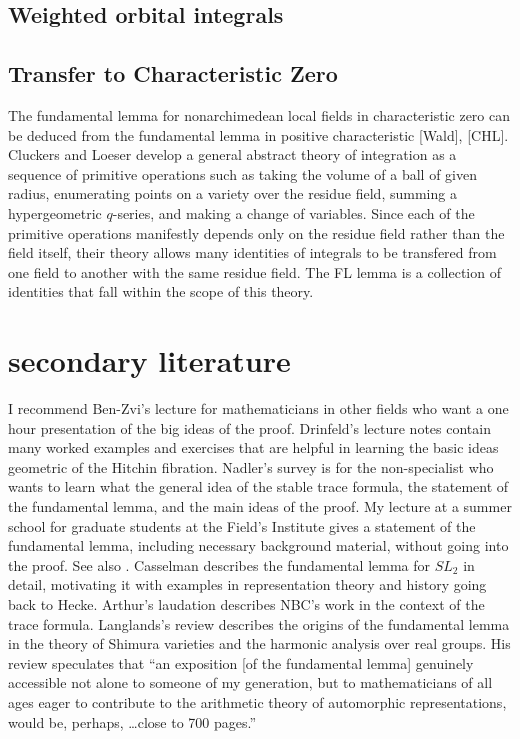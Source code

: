 \documentclass[brochure,english,12pt]{bourbaki}
\begin{document}
\subsection{Weighted orbital integrals}

\subsection{Transfer to Characteristic Zero}

The fundamental lemma for nonarchimedean local fields in
characteristic zero can be deduced from the fundamental lemma in
positive characteristic [Wald], [CHL].  Cluckers and Loeser develop a
general abstract theory of integration as a sequence of primitive
operations such as taking the volume of a ball of given radius,
enumerating points on a variety over the residue field, summing a
hypergeometric $q$-series, and making a change of variables.  Since each
of the primitive operations manifestly depends only on the residue
field rather than the field itself, their theory allows many identities
of integrals to be transfered from one field to another with the same
residue field.  The FL lemma is a collection of identities that fall
within the scope of this theory.

\section{secondary literature}

I recommend Ben-Zvi's lecture for mathematicians in other fields who
want a one hour presentation of the big ideas of the proof.
Drinfeld's lecture notes contain many worked examples and exercises
that are helpful in learning the basic ideas geometric of the Hitchin
fibration.  Nadler's survey is for the non-specialist who wants to
learn what the general idea of the stable trace formula, the statement
of the fundamental lemma, and the main ideas of the proof.  My lecture
at a summer school for graduate students at the Field's Institute
gives a statement of the fundamental lemma, including necessary
background material, without going into the proof.  See also
\cite{Hales}.  Casselman describes the fundamental lemma for $SL_2$ in
detail, motivating it with examples in representation theory and
history going back to Hecke.  Arthur's laudation describes NBC's work
in the context of the trace formula.  Langlands's review describes the
origins of the fundamental lemma in the theory of Shimura varieties
and the harmonic analysis over real groups.  His review speculates
that ``an exposition [of the fundamental lemma] genuinely accessible
not alone to someone of my generation, but to mathematicians of all
ages eager to contribute to the arithmetic theory of automorphic
representations, would be, perhaps, \ldots close to 700 pages.''
\end{document}
